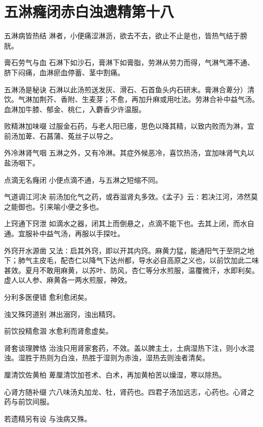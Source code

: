\documentclass[a4paper,12pt,UTF8,twoside]{ctexbook}
\begin{document}
    
    
    
    \section{五淋癃闭赤白浊遗精第十八}
        
    五淋病皆热结
    淋者，小便痛涩淋沥，欲去不去，欲止不止是也，皆热气结于膀胱。
    
    膏石劳气与血
    石淋下如沙石，膏淋下如膏脂，劳淋从劳力而得，气淋气滞不通、脐下闷痛，血淋瘀血停蓄、茎中割痛。
    
    五淋汤是秘诀
    石淋以此汤煎送发灰、滑石、石首鱼头内石研末。膏淋合萆分）清饮。气淋加荆芥、香附、生麦芽；不愈，再加升麻或用吐法。劳淋合补中益气汤。血淋加牛膝、郁金、桃仁，入麝香少许温服。
    
    败精淋加味啜
    过服金石药，与老人阳已痿，思色以降其精，以致内败而为淋，宜前汤加萆、石菖蒲、菟丝子以导之。
    
    外冷淋肾气咽
    五淋之外，又有冷淋。其症外候恶冷，喜饮热汤，宜加味肾气丸以盐汤咽下。
    
    点滴无名癃闭
    小便点滴不通，与五淋之短缩不同。
    
    气道调江河决
    前汤加化气之药，或吞滋肾丸多效。《孟子》云∶若决江河，沛然莫之能御也。引来喻小便之多也。
    
    上窍通下窍泄
    如滴水之器，闭其上而倒悬之，点滴不能下也。去其上闭，而水自通。宜服补中益气汤，再服以手探吐。
    
    外窍开水源凿
    又法∶启其外窍，即以开其内窍。麻黄力猛，能通阳气于至阴之地下；肺气主皮毛，配杏仁以降气下达州都，导水必自高原之义也，以前饮加此二味甚效。夏月不敢用麻黄，以苏叶、防风，杏仁等分水煎服，温覆微汗，水即利矣。虚人以人参、麻黄各一两水煎服，神效。
    
    分利多医便错
    愈利愈闭矣。
    
    浊又殊窍道别
    淋出溺窍，浊出精窍。
    
    前饮投精愈涸
    水愈利而肾愈虚矣。
    
    肾套谈理脾恪
    治浊只用肾家套药，不效。盖以脾主土，土病湿热下注，则小水混浊。湿胜于热则为白浊，热胜于湿则为赤浊，湿热去则浊者清矣。
    
    厘清饮佐黄柏
    萆厘清饮加苍术、白术，再加黄柏苦以燥湿，寒以除热。
    
    心肾方随补缀
    六八味汤丸加龙、牡，肾药也。四君子汤加远志，心药也。心肾之药与前饮间服。
    
    若遗精另有设
    与浊病又殊。
    
\end{document}
